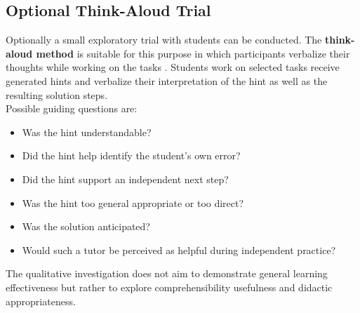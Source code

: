 \documentclass[11pt,a4paper,oneside,ngerman]{memoir}
\begin{document}
\subsection{Optional Think-Aloud Trial}
Optionally a small exploratory trial with students can be conducted. The \textbf{think-aloud method} is suitable for this purpose in which participants verbalize their thoughts while working on the tasks \autocite{ericsson1993protocol,vanSomeren1994thinkaloud}. Students work on selected tasks receive generated hints and verbalize their interpretation of the hint as well as the resulting solution steps.
\hspace{1 cm}\\
Possible guiding questions are:
\begin{itemize}
    \item Was the hint understandable?
    \item Did the hint help identify the student's own error?
    \item Did the hint support an independent next step?
    \item Was the hint too general appropriate or too direct?
    \item Was the solution anticipated?
    \item Would such a tutor be perceived as helpful during independent practice?
\end{itemize}
The qualitative investigation does not aim to demonstrate general learning effectiveness but rather to explore comprehensibility usefulness and didactic appropriateness.
\end{document}
